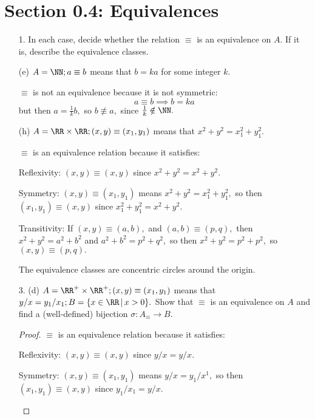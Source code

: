 \documentclass{article}
\begin{document}
\section*{Section 0.4: Equivalences}
\begin{itemize}
	\item[1.] In each case, decide whether the relation $\equiv$ is an equivalence on $A.$ If it is, describe the equivalence classes.
		
		(e) $A=\NN; a\equiv b$ means that $b=ka$ for some integer $k.$
			\begin{soln}
				$\equiv$ is not an equivalence because it is not symmetric: \[a\equiv b\implies b=ka\] but then $a=\frac{1}{k}b,$ so $b\not\equiv a,$ since $\frac{1}{k}\notin\NN.$

			\end{soln}

		(h) $A=\RR\times\RR; (x, y) \equiv(x_1, y_1)$ means that $x^2+y^2=x_1^2+y_1^2.$
			\begin{soln}
				$\equiv$ is an equivalence relation because it satisfies:
				\begin{enumerate}
					\ii Reflexivity: $(x, y)\equiv(x, y)$ since $x^2+y^2=x^2+y^2.$

					\ii Symmetry: $(x, y)\equiv(x_1, y_1)$ means $x^2+y^2=x_1^2+y_1^2,$ so then $(x_1, y_1)\equiv(x, y)$ since $x_1^2+y_1^2=x^2+y^2.$

					\ii Transitivity: If $(x, y)\equiv(a, b),$ and $(a, b)\equiv(p, q),$ then $x^2+y^2=a^2+b^2$ and $a^2+b^2=p^2+q^2,$ so then $x^2+y^2=p^2+p^2,$ so $(x, y)\equiv(p, q).$
				\end{enumerate}

				The equivalence classes are concentric circles around the origin.

			\end{soln}

	\item[3.] (d) $A=\RR^+\times\RR^+; (x, y)\equiv(x_1, y_1)$ means that $y/x = y_1/x_1; B=\{x\in\RR\,\vert\, x>0\}.$ Show that $\equiv$ is an equivalence on $A$ and find a (well-defined) bijection $\sigma: A_{\equiv}\to B.$
			\begin{proof}
				$\equiv$ is an equivalence relation because it satisfies:
				\begin{enumerate}
					\ii Reflexivity: $(x, y)\equiv(x, y)$ since $y/x=y/x.$

					\ii Symmetry: $(x, y)\equiv(x_1, y_1)$ means $y/x=y_1/x^1,$ so then $(x_1, y_1)\equiv(x, y)$ since $y_1/x_1=y/x.$


\end{enumerate}
\end{proof}
\end{itemize}
\end{document}
